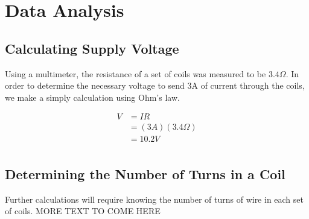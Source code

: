\documentclass[a4paper]{article}
\begin{document}
\section{Data Analysis}


\subsection{Calculating Supply Voltage}

Using a multimeter, the resistance of a set of coils was measured to be $3.4 \Omega$. In order to determine the necessary voltage to send 3A of current through the coils, we make a simply calculation using Ohm's law.

\begin{align*}
V &= IR \\
  &= (3A)(3.4 \Omega) \\
  &= 10.2V \\
\end{align*}

\subsection{Determining the Number of Turns in a Coil}

Further calculations will require knowing the number of turns of wire in each set of coils. MORE TEXT TO COME HERE

\end{document}

